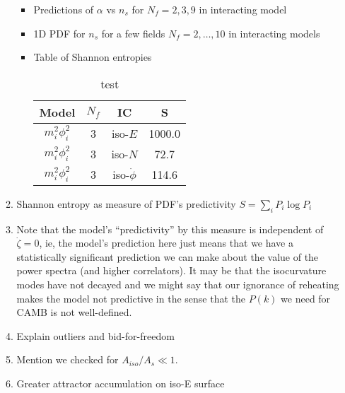 \documentclass[a4paper,11pt]{article}
\begin{document}
\begin{enumerate}
\begin{enumerate}
\begin{itemize}
          \item Predictions of $\alpha$ vs $n_s$ for $N_f=2,3,9$ in interacting model

          \item 1D PDF for $n_s$ for a few fields $N_f=2,\dots,10$ in interacting models

          \item Table of Shannon entropies

            \begin{table}
              \centering
              \begin{tabular}{| c  c  c  c |}
                \hline
                Model & $N_f$ & IC & S \\
                \hline
                $m_i^2 \phi_i^2$            & 3 & iso-$E$ & 1000.0 \\
                $m_i^2 \phi_i^2$            & 3 & iso-$N$ & 72.7   \\
                $m_i^2 \phi_i^2$            & 3 & iso-$\dot \phi$ & 114.6  \\
                \hline
              \end{tabular}
              \caption{test}
              \label{table:ratio}
            \end{table}

        \end{itemize}

      \item Shannon entropy as measure of PDF's predictivity $S = \sum_i P_i \log P_i$

      \item Note that the model's ``predictivity'' by this measure is independent of $\dot \zeta =0$, ie, the model's prediction here just means that we have a statistically significant prediction we can make about the value of the power spectra (and higher correlators).  It may be that the isocurvature modes have not decayed and we might say that our ignorance of reheating makes the model not predictive in the sense that the $P(k)$ we need for CAMB is not well-defined.

      \item Explain outliers and bid-for-freedom

      \item Mention we checked for $A_{iso}/A_s \ll 1$.

      \item Greater attractor accumulation on iso-E surface

    \end{enumerate}


\end{enumerate}
\end{document}
